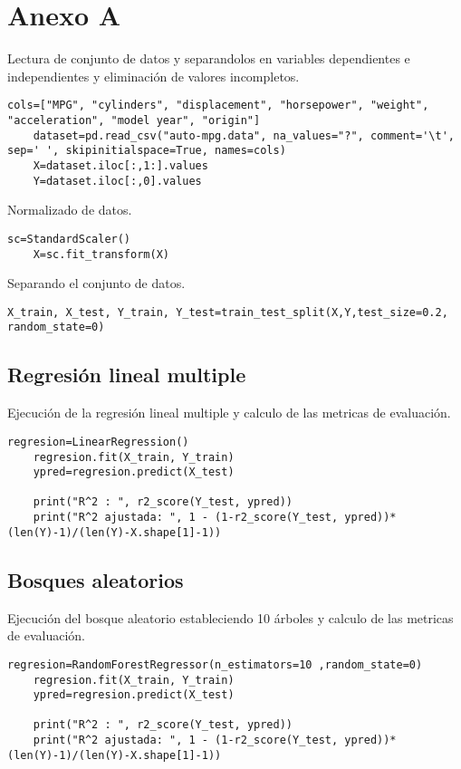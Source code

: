 \documentclass[conference]{IEEEtran}
\begin{document}
\section{Anexo A}
Lectura de conjunto de datos y separandolos en variables dependientes e independientes y eliminación de valores incompletos.  
\lstset{language=Python, breaklines=true, basicstyle=\footnotesize}
\lstset{numbers=left, numberstyle=\tiny, stepnumber=1, numbersep=-2pt}
\begin{lstlisting}[frame=single]
    cols=["MPG", "cylinders", "displacement", "horsepower", "weight", "acceleration", "model year", "origin"]
    dataset=pd.read_csv("auto-mpg.data", na_values="?", comment='\t', sep=' ', skipinitialspace=True, names=cols)
    X=dataset.iloc[:,1:].values
    Y=dataset.iloc[:,0].values
\end{lstlisting}

Normalizado de datos. 
\begin{lstlisting}[frame=single]
    sc=StandardScaler()
    X=sc.fit_transform(X)
\end{lstlisting}

Separando el conjunto de datos.
\begin{lstlisting}[frame=single]
    X_train, X_test, Y_train, Y_test=train_test_split(X,Y,test_size=0.2, random_state=0)
\end{lstlisting}

\subsection{Regresión lineal multiple}

Ejecución de la regresión lineal multiple y calculo de las metricas de evaluación. 
\begin{lstlisting}[frame=single]
    regresion=LinearRegression()
    regresion.fit(X_train, Y_train)
    ypred=regresion.predict(X_test)

    print("R^2 : ", r2_score(Y_test, ypred))
    print("R^2 ajustada: ", 1 - (1-r2_score(Y_test, ypred))*(len(Y)-1)/(len(Y)-X.shape[1]-1))
\end{lstlisting}

\subsection{Bosques aleatorios}
Ejecución del bosque aleatorio estableciendo 10 árboles y calculo de las metricas de evaluación. 
\begin{lstlisting}[frame=single]
    regresion=RandomForestRegressor(n_estimators=10 ,random_state=0) 
    regresion.fit(X_train, Y_train)
    ypred=regresion.predict(X_test)
    
    print("R^2 : ", r2_score(Y_test, ypred))
    print("R^2 ajustada: ", 1 - (1-r2_score(Y_test, ypred))*(len(Y)-1)/(len(Y)-X.shape[1]-1))

\end{lstlisting}
\end{document}
